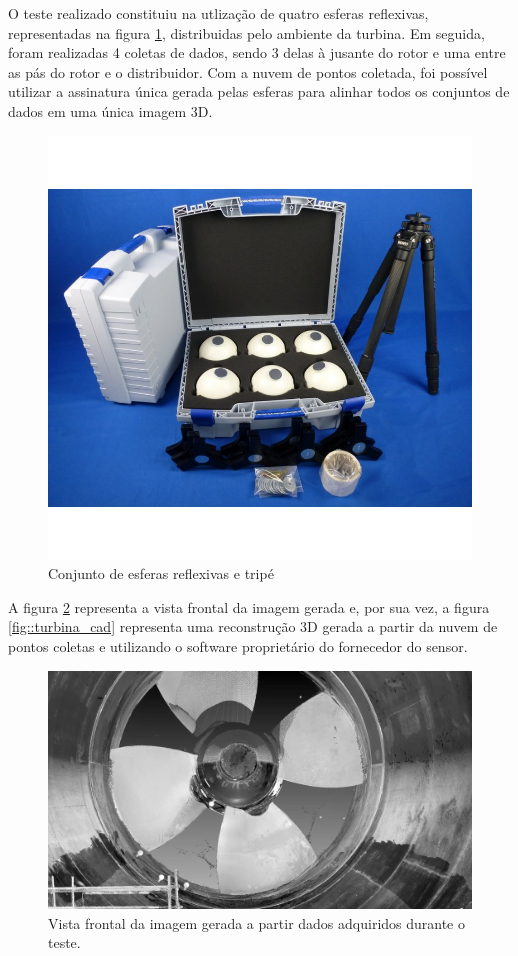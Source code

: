 O teste realizado constituiu na utlização de quatro esferas reflexivas,
representadas na figura \ref{fig::esferas}, distribuidas pelo ambiente da
turbina.
Em seguida, foram realizadas 4 coletas de dados, sendo 3 delas à jusante do
rotor e uma entre as pás do rotor e o distribuidor. Com a nuvem de pontos
coletada, foi possível utilizar a assinatura única gerada pelas esferas para
alinhar todos os conjuntos de dados em uma única imagem 3D.

\begin{figure}[h!]
\centering
	\includegraphics[width=0.7\columnwidth]{detail/figs/3dsensors/kit}
	\caption{Conjunto de esferas reflexivas e tripé}
	\label{fig::esferas}
\end{figure}

A figura \ref{fig::turbina_faro} representa a vista frontal da imagem gerada e, por sua
vez, a figura \ref{fig::turbina_cad} representa uma reconstrução 3D gerada a
partir da nuvem de pontos coletas e utilizando o software proprietário do
fornecedor do sensor. 

\begin{figure}[h!]
\centering
	\includegraphics[width=0.8\columnwidth]{detail/figs/3dsensors/recorte_video}
	\caption{Vista frontal da imagem gerada a partir dados adquiridos durante o
	teste.}
	\label{fig::turbina_faro}
\end{figure}

